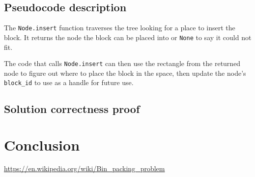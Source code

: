 \subsection{Pseudocode description}
The \texttt{Node.insert} function traverses the tree looking for a place
to insert the block.
It returns the node the block can be placed into or \texttt{None} to say
it could not fit.

The code that calls \texttt{Node.insert} can then use the rectangle
from the returned node to figure out where to place the block in the space,
then update the node's \texttt{block\_id} to use as a handle for future use.

\subsection{Solution correctness proof}

\section{Conclusion}

\newpage
\begin{thebibliography}{9}
	\url{https://en.wikipedia.org/wiki/Bin_packing_problem}
\end{thebibliography}


